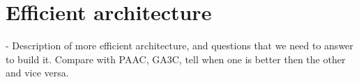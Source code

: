 \section{Efficient architecture}

- Description of more efficient architecture, and questions that we need to
  answer to build it. Compare with PAAC, GA3C, tell when one is better then
  the other and vice versa.
